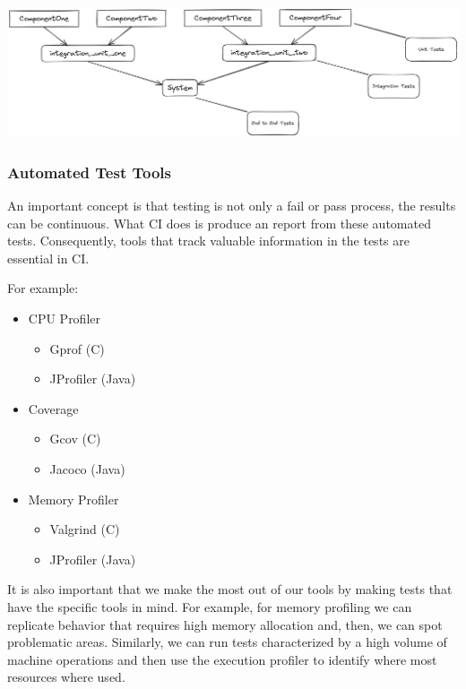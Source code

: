 \documentclass{article}
\begin{document}
\vspace{20pt}
\includegraphics[width=\linewidth]{ModularizedTesting(1).png}

\newpage
\subsubsection{Automated Test Tools}

An important concept is that testing is not only a fail or pass process, the results can be continuous.
What CI does is produce an report from these automated tests.
Consequently, tools that track valuable information in the tests are essential in CI.

For example:

\begin{itemize}
    \item CPU Profiler
    \begin{itemize}
        \item Gprof (C)
        \item JProfiler (Java)
    \end{itemize}
    \item Coverage
    \begin{itemize}
        \item Gcov (C)
        \item Jacoco (Java) 
    \end{itemize}
    \item Memory Profiler
    \begin{itemize}
        \item Valgrind (C)
        \item JProfiler (Java)
    \end{itemize}
\end{itemize}

It is also important that we make the most out of our tools by making tests that have the specific tools in mind.
For example, for memory profiling we can replicate behavior that requires high memory allocation and, then, we can spot problematic areas.
Similarly, we can run tests characterized by a high volume of machine operations and then use the execution profiler to identify where most resources where used.
\end{document}
